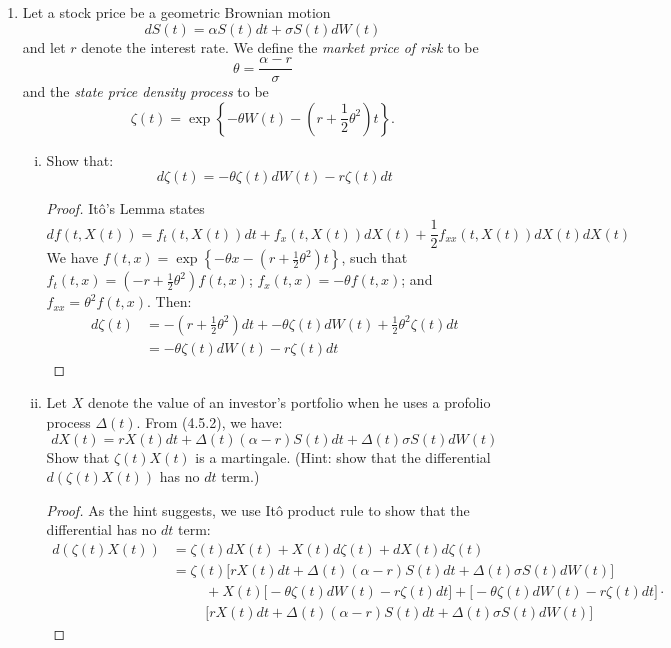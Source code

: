 \documentclass{article}
\makeatletter
\newcommand{\mylabel}[2]{#2\def\@currentlabel{#2}\label{#1}}
\newcommand{\pr}[1]{ \item[\mylabel{}{#1.}]}
\newcommand{\seq}[1]{\left\{ #1 \right\}}
\theoremstyle{definition}
\theoremstyle{definition}
\makeatother
\begin{document}
\begin{enumerate}
    \pr{4.18} Let a stock price be a geometric Brownian motion
    $$ dS(t) = \alpha S(t) dt+ \sigma S(t) dW(t)$$
    and let $r$ denote the interest rate. We define the \textit{market price of risk} to be
    $$ \theta=\frac{\alpha-r}{\sigma}$$
    and the \textit{state price density process} to be
    $$ \zeta(t) = \exp\seq{-\theta W(t)- \left( r+\frac{1}{2}\theta^2 \right)t}.$$
    \begin{enumerate}[(i)]
        \item Show that:
        $$ d\zeta(t) = -\theta \zeta(t) dW(t)-r \zeta(t) dt$$
        \begin{proof} It\^{o}'s Lemma states $$ df(t,X(t)) = f_t(t,X(t)) dt + f_x(t,X(t)) dX(t) + \frac{1}{2}f_{xx}(t,X(t))dX(t)dX(t)$$
We have $f(t,x) = \exp\seq{-\theta x - \left( r+\frac{1}{2}\theta^2 \right)t}$, such that $f_t (t,x) = (-r+\frac{1}{2}\theta^2 )f(t,x)$; $f_x(t,x) = -\theta f(t,x) $; and $f_{xx} = \theta^2 f(t,x)$. Then:
\begin{align*}d\zeta(t) &= - \left( r+\frac{1}{2}\theta^2 \right)dt + -\theta \zeta(t)dW(t) + \frac{1}{2}\theta^2 \zeta(t)dt \\
&=-\theta \zeta(t) dW(t)-r \zeta(t) dt
\end{align*}
        \end{proof}
        
        \item Let $X$ denote the value of an investor's portfolio when he uses a profolio process $\Delta(t).$ From (4.5.2), we have:
        $$ dX(t) = rX(t) dt + \Delta(t) (\alpha-r)S(t)dt + \Delta(t)\sigma S(t) dW(t)$$
        Show that $\zeta(t)X(t)$ is a martingale. (Hint: show that the differential $d(\zeta(t)X(t))$ has no $dt$ term.)
        
        \begin{proof} As the hint suggests, we use It\^{o} product rule to show that the differential has no $dt$ term:
        \begin{align*}
            d(\zeta(t)X(t)) &= \zeta(t)dX(t) + X(t)d\zeta(t) +dX(t)d\zeta(t) \\
            &= \zeta(t) \big[  rX(t) dt + \Delta(t) (\alpha-r)S(t)dt + \Delta(t)\sigma S(t) dW(t) \big] \\
            & \hspace{1cm} + X(t)\big[ -\theta \zeta(t) dW(t)-r \zeta(t) dt \big] + \big[ -\theta \zeta(t) dW(t)-r \zeta(t) dt \big] \cdot \\
            &\hspace{1cm} \big[  rX(t) dt + \Delta(t) (\alpha-r)S(t)dt + \Delta(t)\sigma S(t) dW(t) \big]
        \end{align*}
        

\end{proof}
\end{enumerate}
\end{enumerate}
\end{document}

